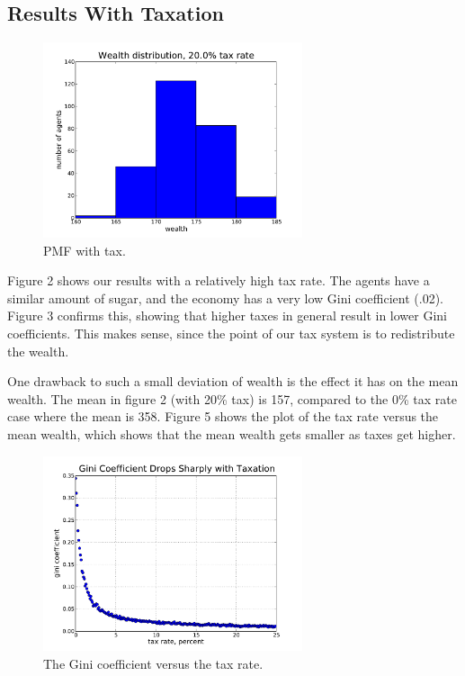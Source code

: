 \subsection{Results With Taxation}

\begin{figure}[ht]
\centering
\includegraphics[width=3.0in]{figs/pmf_20percent.pdf}
\caption{PMF with tax.}
\end{figure}

Figure 2 shows our results with a relatively high tax rate. The agents have a similar amount of sugar, and the economy has a very low Gini coefficient (.02). Figure 3 confirms this, showing that higher taxes in general result in lower Gini coefficients. This makes sense, since the point of our tax system is to redistribute the wealth.

One drawback to such a small deviation of wealth is the effect it has on the mean wealth. The mean in figure 2 (with 20\% tax) is 157, compared to the 0\% tax rate case where the mean is 358. Figure 5 shows the plot of the tax rate versus the mean wealth, which shows that the mean wealth gets smaller as taxes get higher.


\begin{figure}[ht]
\centering
\includegraphics[width=3.0in]{figs/gini_coeff.pdf}
\caption{The Gini coefficient versus the tax rate.}
\end{figure}

